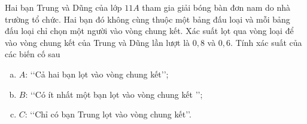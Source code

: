 \begin{vd}%
	Hai bạn Trung và Dũng của lớp $11A$ tham gia giải bóng bàn đơn nam do nhà trường tổ chức. Hai bạn đó không cùng thuộc một bảng đấu loại và mỗi bảng đấu loại chỉ chọn một người vào vòng chung kết. Xác suất lọt qua vòng loại để vào vòng chung kết của Trung và Dũng lần lượt là $0{,}8$ và $0{,}6$. Tính xác suất của các biến cố sau
	\begin{enumerate}[a)]
		\item $A$: \lq\lq Cả hai bạn lọt vào vòng chung kết\rq\rq;
		\item $B$: \lq\lq Có ít nhất một bạn lọt vào vòng chung kết \rq\rq;
		\item $C$: \lq\lq Chỉ có bạn Trung lọt vào vòng chung kết\rq\rq.		
	\end{enumerate}
	
\end{vd}

